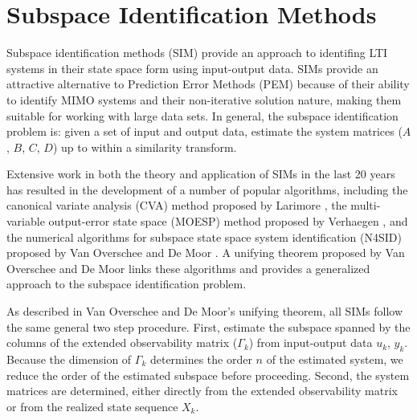 \chapter{Subspace Identification Methods}
Subspace identification methods (SIM) provide an approach to identifing LTI systems in their state space form using input-output data. SIMs provide an attractive alternative to Prediction Error Methods (PEM) because of their ability to identify MIMO systems and their non-iterative solution nature, making them suitable for working with large data sets. In general, the subspace identification problem is: given a set of input and output data, estimate the system matrices ($A$, $B$, $C$, $D$) up to within a similarity transform. 

Extensive work in both the theory and application of SIMs in the last 20 years has resulted in the development of a number of popular algorithms, including the canonical variate analysis (CVA) method proposed by Larimore \cite{larimore1990canonical}, the multi-variable output-error state space (MOESP) method proposed by Verhaegen \cite{verhaegen1992subspace}, and the numerical algorithms for subspace state space system identification (N4SID) proposed by Van Overschee and De Moor \cite{van1994n4sid}. A unifying theorem proposed by Van Overschee and De Moor \cite{van1995unifying} links these algorithms and provides a generalized approach to the subspace identification problem.  

As described in Van Overschee and De Moor's unifying theorem, all SIMs follow the same general two step procedure. First, estimate the subspace spanned by the columns of the extended observability matrix ($\Gamma_k$) from input-output data $u_k$, $y_k$. Because the dimension of $\Gamma_k$ determines the order $n$ of the estimated system, we reduce the order of the estimated subspace before proceeding. Second, the system matrices are determined, either directly from the extended observability matrix or from the realized state sequence $X_k$.


